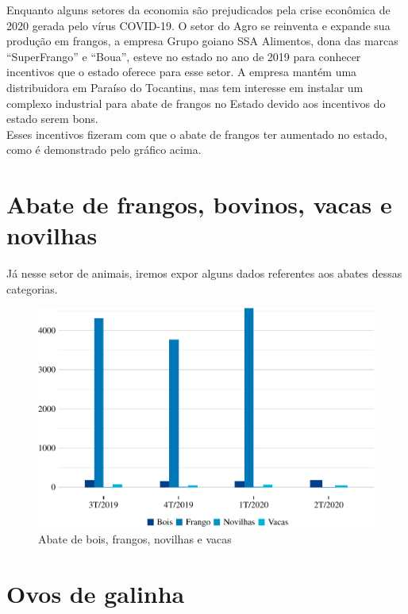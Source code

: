 \par Enquanto alguns setores da economia são prejudicados pela crise econômica de 2020 gerada pelo vírus COVID-19. O setor do Agro se reinventa e expande sua produção em frangos, a empresa Grupo goiano SSA Alimentos, dona das marcas “SuperFrango” e “Boua”, esteve no estado no ano de 2019 para conhecer incentivos que o estado oferece para esse setor. A empresa mantém uma distribuidora em Paraíso do Tocantins, mas tem interesse em instalar um complexo industrial para abate de frangos no Estado devido aos incentivos do estado serem bons. \\
Esses incentivos fizeram com que o abate de frangos ter aumentado no estado, como é demonstrado pelo gráfico acima.

\section{Abate de frangos, bovinos, vacas e novilhas}

\par Já nesse setor de animais, iremos expor alguns dados referentes aos abates dessas categorias.

\begin{figure}[h]
	\caption{Abate de bois, frangos, novilhas e vacas}
	\includegraphics{fig/abates-1.pdf}
\end{figure}
	

\section{Ovos de galinha}

